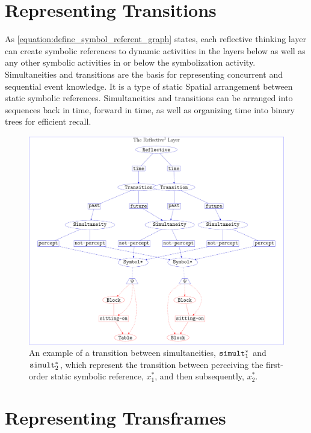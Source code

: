 \section{Representing Transitions}

As {\mbox{\autoref{equation:define_symbol_referent_graph}}} states,
each reflective thinking layer can create symbolic references to
dynamic activities in the layers below as well as any other symbolic
activities in or below the symbolization activity.  Simultaneities and
transitions are the basis for representing concurrent and sequential
event knowledge.  It is a type of static Spatial arrangement between
static symbolic references.  Simultaneities and transitions can be
arranged into sequences back in time, forward in time, as well as
organizing time into binary trees for efficient recall.
\begin{figure}
\center
\includegraphics[width=12cm]{gfx/example_transition}
\caption[An example of a transition between simultaneities.]{An
  example of a transition between simultaneities,
  $\text{\tt{simult}}_1^*$ and $\text{\tt{simult}}_2^*$, which
  represent the transition between perceiving the first-order static
  symbolic reference, $x_1^*$, and then subsequently, $x_2^*$.}
\label{figure:example_transition}
\end{figure}

\section{Representing Transframes}

